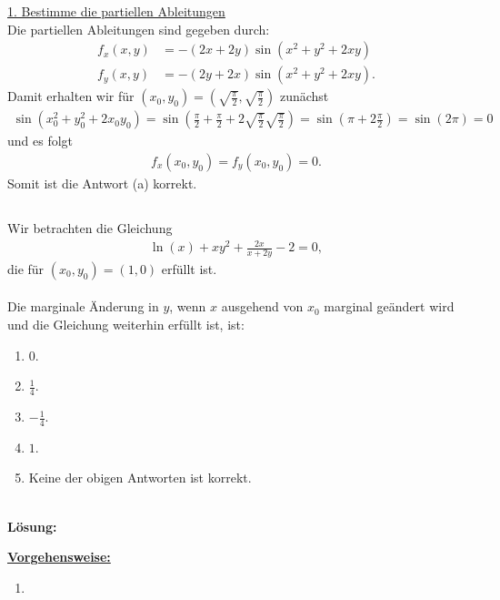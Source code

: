 \underline{1. Bestimme die partiellen Ableitungen}\\
Die partiellen Ableitungen sind gegeben durch:
\begin{align*}
	f_x(x,y)
	&=
	-(2x + 2y) \sin(x^2 +y^2 +2xy) 
	\\
	f_y(x,y)
	&=
	-(2y + 2x) \sin(x^2 +y^2 +2xy).
\end{align*}
Damit erhalten wir für $(x_0, y_0) = \left(\sqrt{\frac{\pi}{2}}, \sqrt{\frac{\pi}{2}}\right)$ zunächst
\begin{align*}
	\sin(x_0^2 + y_0^2 + 2 x_0 y_0)
	=
	\sin\left(\frac{\pi}{2} + \frac{\pi}{2} +2 \sqrt{\frac{\pi}{2}} \sqrt{\frac{\pi}{2}} \right)
	=
	\sin\left(\pi +2 \frac{\pi}{2} \right)
	= 
	\sin(2 \pi ) = 0
\end{align*}
und es folgt
\begin{align*}
	f_x(x_0,y_0) = f_y(x_0,y_0) = 0.
\end{align*}
Somit ist die Antwort (a) korrekt.


\newpage

\subsection*{}
Wir betrachten die Gleichung
\begin{align*}
	\ln(x) + x y^2 + \frac{2x}{x + 2y} - 2 = 0,
\end{align*}
die für $(x_0,y_0) = (1,0)$ erfüllt ist.\\
\\
Die marginale Änderung in $y$, wenn $x$ ausgehend von $x_0$ marginal geändert wird und die Gleichung weiterhin erfüllt ist, ist:
\renewcommand{\labelenumi}{(\alph{enumi})}
\begin{enumerate}
	\item 
	$ 0 $.
	\item
	$ \frac{1}{4}$.
	\item
	$ -\frac{1}{4}$.
	\item
	$ 1$.
	\item
	Keine der obigen Antworten ist korrekt.
\end{enumerate}
\ \\
\textbf{Lösung:}
\begin{mdframed}
\underline{\textbf{Vorgehensweise:}}
\renewcommand{\labelenumi}{\theenumi.}
\begin{enumerate}
\item 
\end{enumerate}
\end{mdframed}

